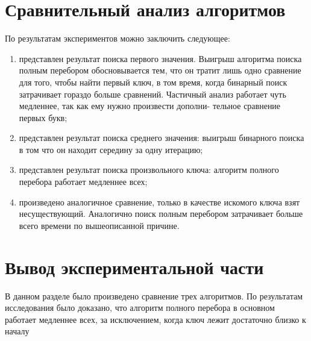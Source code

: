 


\section{Сравнительный анализ алгоритмов}\label{comparepart}

По результатам экспериментов можно заключить следующее:
\begin{enumerate}
    \item представлен результат поиска первого значения. Выигрыш алгоритма
    поиска полным перебором обосновывается тем, что он тратит лишь одно сравнение для того, чтобы найти первый ключ, в том время, когда
    бинарный поиск затрачивает гораздо больше сравнений. Частичный анализ работает чуть медленнее, так как ему нужно произвести дополни-
    тельное сравнение первых букв;
    \item представлен результат поиска среднего значения: выигрыш бинарного поиска в том что он находит середину за одну итерацию; 
    \item представлен результат поиска произвольного ключа: алгоритм полного перебора работает медленнее всех;
    \item произведено аналогичное сравнение, только в качестве искомого ключа взят несуществующий. 
    Аналогично поиск полным перебором затрачивает больше всего времени по вышеописанной причине.
\end{enumerate}

\section{Вывод экспериментальной части}\label{experimentresult}

В данном разделе было произведено сравнение трех алгоритмов. По
результатам исследования было доказано, что алгоритм полного перебора в
основном работает медленнее всех, за исключением, когда ключ лежит достаточно близко к началу

